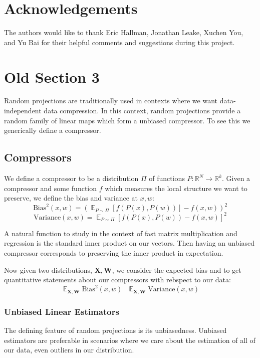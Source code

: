 \documentclass{article}
\theoremstyle{definition}
\theoremstyle{plain}
\newcommand{\R}{\mathbb{R}}
\DeclareMathOperator{\E}{\mathbb{E}}
\begin{document}
\section*{Acknowledgements}
The authors would like to thank Eric Hallman, Jonathan Leake, Xuchen You, and Yu Bai for their helpful comments and suggestions during this project.




\appendix

\section{Old Section 3}

\newpage

Random projections are traditionally used in contexts where we want data-independent data compression. In this context, random projections provide a random family of linear maps which form a unbiased compressor. To see this we generically define a compressor.
\subsection*{Compressors}
We define a compressor to be a distribution $\Pi$ of functions $P: \R^N \to \R^k$. Given a compressor and some function $f$ which measures the local structure we want to preserve, we define the bias and variance at $x,w$:
\[\text{Bias}^2(x,w) = \left(\E_{P \sim \Pi} [f(P(x), P(w))] - f(x,w)\right)^2\]
\[\text{Variance}(x,w) =  \E_{P \sim \Pi} [f(P(x), P(w)) - f(x,w)]^2\]

A natural function to study in the context of fast matrix multiplication and regression is the standard inner product on our vectors. Then having an unbiased compressor corresponds to preserving the inner product in expectation. 

Now given two distributions, $\mathbf{X}, \mathbf{W}$, we consider the expected bias and to get quantitative statements about our compressors with rebspect to our data:
\[\E_{\mathbf{X}, \mathbf{W}} \text{Bias}^2(x,w)~~~ \E_{\mathbf{X},\mathbf{W}} \text{Variance}(x,w)\]




\subsubsection*{Unbiased Linear Estimators}
The defining feature of random projections is its unbiasedness. Unbiased estimators are preferable in scenarios where we care about the estimation of all of our data, even outliers in our distribution. 
\end{document}

